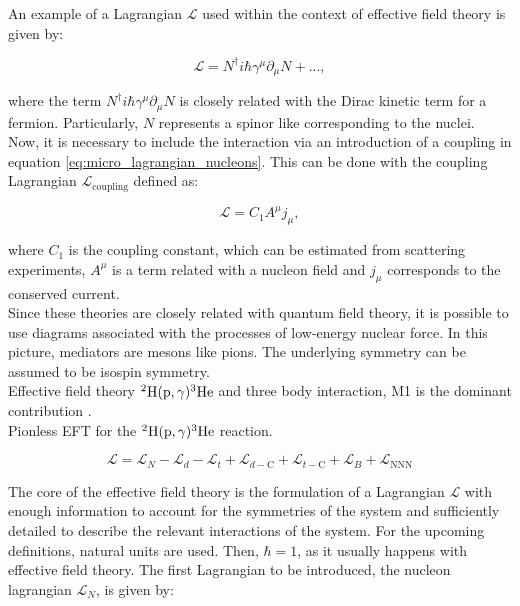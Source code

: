 \documentclass[openany]{book}
\begin{document}
An example of a Lagrangian $\mathcal{L}$ used within the context of effective field theory is given by: 

\begin{equation} \label{eq:micro_lagrangian_nucleons}
	\mathcal{L} = N^{\dagger}i\hbar\gamma^\mu\partial_\mu N + ... ,
\end{equation}

where the term $ N^{\dagger}i\hbar\gamma^\mu\partial_\mu N$ is closely related with the Dirac kinetic term for a fermion. Particularly, $N$ represents a spinor like corresponding to the nuclei. \\

Now, it is necessary to include the interaction via an introduction of a coupling in equation \ref{eq:micro_lagrangian_nucleons}. This can be done with the coupling Lagrangian  $	\mathcal{L}_{\mathrm{coupling}} $ defined as: 

 \begin{equation} \label{eq:micro_lagrangian_coupling}
 	\mathcal{L} =  C_1 A^\mu j_\mu ,
 \end{equation}

where $C_1$ is the coupling constant, which can be estimated from scattering experiments, $A^\mu $ is a term related with a nucleon field and $j_\mu$ corresponds to the conserved current.  \\

Since these theories are closely related with quantum field theory, it is possible to use diagrams associated with the processes of low-energy nuclear force. In this picture, mediators are mesons like pions. The underlying symmetry can be assumed to be isospin symmetry.  \\

Effective field theory $\mathrm{{}^{2}H(p, \gamma){}^{3}He}$ and three body interaction, M1 is the dominant contribution \cite{sadeghi_khalili_godarzi_2013}. \\

Pionless EFT for the $\mathrm{{}^{2}H(p, \gamma){}^{3}He}$ reaction. 

\begin{equation}\label{eq:micro_EFT_lagrangian_extended}
	\mathcal{L} = \mathcal{L}_N  -  \mathcal{L}_d -   \mathcal{L}_t +  \mathcal{L}_{d-\mathrm{C}}  +   \mathcal{L}_{t-\mathrm{C}} + \mathcal{L}_B + \mathcal{L}_{\mathrm{NNN}}
\end{equation}

The core of the effective field theory is the formulation of a Lagrangian $\mathcal{L}$ with enough information to account for the symmetries of the system and sufficiently detailed to describe the relevant interactions of the system. For the upcoming definitions, natural units are used. Then, $\hbar = 1$, as it usually happens with effective field theory. The first Lagrangian to be introduced, the nucleon lagrangian $\mathcal{L}_N$, is given by:
 
\end{document}
